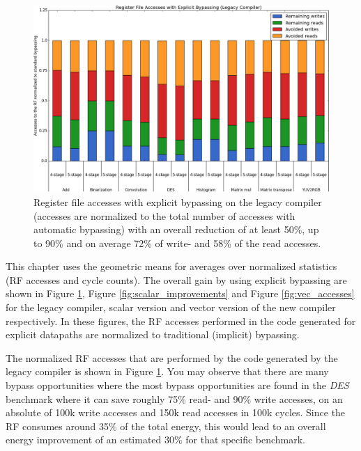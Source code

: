 \begin{figure}[b!]
\centering
\hspace*{-.12in}
\includegraphics[width=.875\textwidth]{figures/stats/legacy_accesses}
\caption{Register file accesses with explicit bypassing on the legacy compiler (accesses are normalized to the total number of accesses with automatic bypassing) with an overall reduction of at least 50\%, up to 90\% and on average 72\% of write- and 58\% of the read accesses.} %
\label{fig:legacy_access_improvements}
\end{figure}

This chapter uses the geometric means for averages over normalized statistics (RF accesses and cycle counts). The overall gain by using explicit bypassing are shown in Figure \ref{fig:legacy_access_improvements}, Figure \ref{fig:scalar_improvements} and Figure \ref{fig:vec_accesses} for the legacy compiler, scalar version and vector version of the new compiler respectively. In these figures, the RF accesses performed in the code generated for explicit datapaths are normalized to traditional (implicit) bypassing.





The normalized RF accesses that are performed by the code generated by the legacy compiler is shown in Figure \ref{fig:legacy_access_improvements}. You may observe that there are many bypass opportunities where the most bypass opportunities are found in the \emph{DES} benchmark where it can save roughly 75\% read- and 90\% write accesses, on an absolute of 100k write accesses and 150k read accesses in 100k cycles. Since the RF consumes around 35\% of the total energy, this would lead to an overall energy improvement of an estimated 30\% for that specific benchmark.




